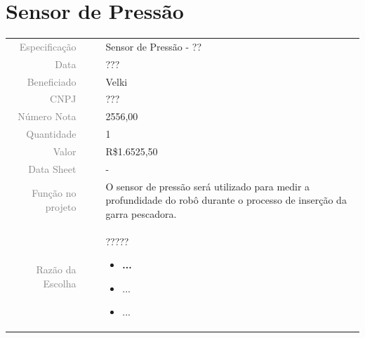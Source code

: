 

\section{Sensor de Pressão}
\label{pressao}


\begin{table}[ht!]

	\begin{tabular}{r l|l p{12cm} }
		
		\textcolor{gray}{Especificação} &&& 	{Sensor de Pressão - ??}\\
		\textcolor{gray}{Data} &&& 				{???}\\
        \textcolor{gray}{Beneficiado} &&&		{Velki} \\
        \textcolor{gray}{CNPJ} &&& 				{???} \\
        \textcolor{gray}{Número Nota} &&& 		{2556,00} \\
		\textcolor{gray}{Quantidade} &&& 		{1} \\
		\textcolor{gray}{Valor} &&& 			{R\$1.6525,50} \\
		\textcolor{gray}{Data Sheet} &&& 		{-} \\

		\textcolor{gray}{Função no projeto} &&& {O sensor de pressão será utilizado para medir a profundidade do robô durante o processo de inserção da garra pescadora.} \\
		\textcolor{gray}{Razão da Escolha} &&& {   ?????   

		\begin{itemize}
		  \item \textbf{...} 
		  \item ...
		  \item ...
		\end{itemize}}
		

	\end{tabular}
\end{table}

\newpage

